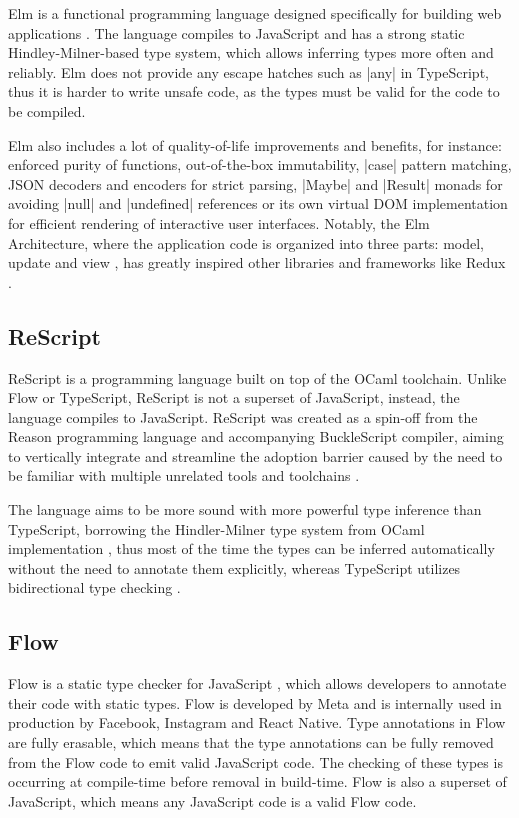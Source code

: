 Elm is a functional programming language designed specifically for building web applications \cite{ElmDelightfulLanguage}. The language compiles to JavaScript and has a strong static Hindley-Milner-based type system, which allows inferring types more often and reliably. Elm does not provide any escape hatches such as \code|any| in TypeScript, thus it is harder to write unsafe code, as the types must be valid for the code to be compiled.

Elm also includes a lot of quality-of-life improvements and benefits, for instance: enforced purity of functions, out-of-the-box immutability, \code|case| pattern matching, JSON decoders and encoders for strict parsing, \code|Maybe| and \code|Result| monads for avoiding \code|null| and \code|undefined| references or its own virtual DOM implementation for efficient rendering of interactive user interfaces. Notably, the Elm Architecture, where the application code is organized into three parts: model, update and view \cite{ElmArchitectureIntroduction}, has greatly inspired other libraries and frameworks like Redux \cite{PriorArtRedux2022}.

\subsection{ReScript}

ReScript is a programming language built on top of the OCaml toolchain. Unlike Flow or TypeScript, ReScript is not a superset of JavaScript, instead, the language compiles to JavaScript. ReScript was created as a spin-off from the Reason programming language and accompanying BuckleScript compiler, aiming to vertically integrate and streamline the adoption barrier caused by the need to be familiar with multiple unrelated tools and toolchains \cite{BuckleScriptReasonRebranding}.

The language aims to be more sound with more powerful type inference than TypeScript, borrowing the Hindler-Milner type system from OCaml implementation \cite{EfficientInsightfulGeneralization, HistoryReScript2022}, thus most of the time the types can be inferred automatically without the need to annotate them explicitly, whereas TypeScript utilizes bidirectional type checking \cite{ReconstructingTypeScriptPart}.

\subsection{Flow}

Flow is a static type checker for JavaScript \cite{chaudhuriFastPreciseType2017, Flow2023}, which allows developers to annotate their code with static types. Flow is developed by Meta and is internally used in production by Facebook, Instagram and React Native. Type annotations in Flow are fully erasable, which means that the type annotations can be fully removed from the Flow code to emit valid JavaScript code. The checking of these types is occurring at compile-time before removal in build-time. Flow is also a superset of JavaScript, which means any JavaScript code is a valid Flow code.

